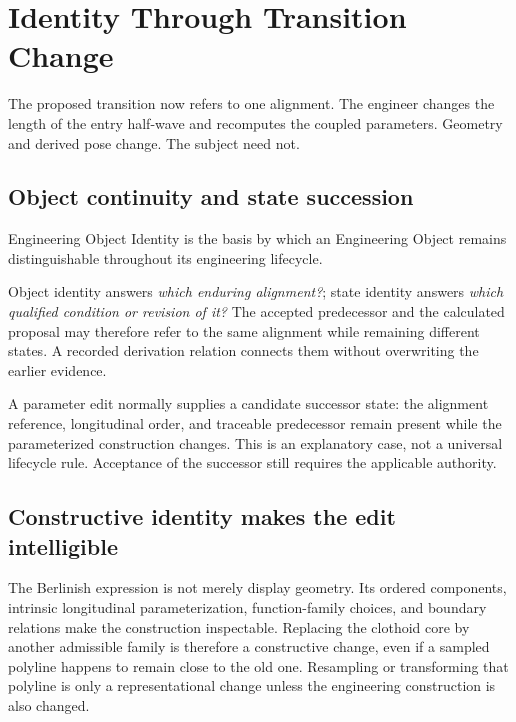 
\chapter{Identity Through Transition Change}
\label{chap:engineering-identity}

The proposed transition now refers to one alignment. The engineer changes the
length of the entry half-wave and recomputes the coupled parameters. Geometry
and derived pose change. The subject need not.

\section{Object continuity and state succession}

\begin{definition}
\label{def:engineering-object-identity}
Engineering Object Identity is the basis by which an Engineering Object
remains distinguishable throughout its engineering lifecycle.
\end{definition}

Object identity answers \emph{which enduring alignment?}; state identity
answers \emph{which qualified condition or revision of it?} The accepted
predecessor and the calculated proposal may therefore refer to the same
alignment while remaining different states. A recorded derivation relation
connects them without overwriting the earlier evidence.

A parameter edit normally supplies a candidate successor state: the alignment
reference, longitudinal order, and traceable predecessor remain present while
the parameterized construction changes. This is an explanatory case, not a
universal lifecycle rule. Acceptance of the successor still requires the
applicable authority.

\section{Constructive identity makes the edit intelligible}

The Berlinish expression is not merely display geometry. Its ordered
components, intrinsic longitudinal parameterization, function-family choices,
and boundary relations make the construction inspectable. Replacing the
clothoid core by another admissible family is therefore a constructive change,
even if a sampled polyline happens to remain close to the old one. Resampling
or transforming that polyline is only a representational change unless the
engineering construction is also changed.

